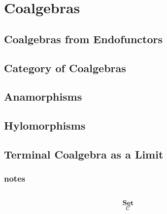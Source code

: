 \documentclass[DaoFP]{subfiles}
\begin{document}
\setcounter{chapter}{11}

\chapter{Coalgebras}

\section{Coalgebras from Endofunctors}

\section{Category of Coalgebras}

\section{Anamorphisms}

\section{Hylomorphisms}

\section{Terminal Coalgebra as a Limit}


\subsection{notes}


\begin{exercise}
\end{exercise}

\begin{haskell}
\end{haskell}

\[
 \begin{tikzcd}
  \end{tikzcd}
\]

\[   \mathbf{Set} \]
\[   \mathcal{C} \]
\end{document}
